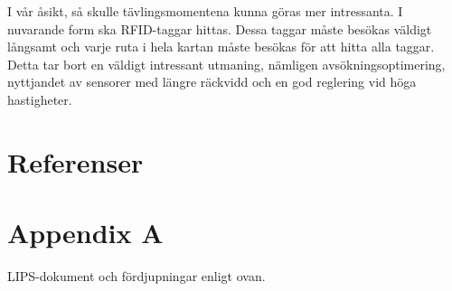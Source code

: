\documentclass[a4paper,12pt,fleqn]{article}
\begin{document}
I vår åsikt, så skulle tävlingsmomentena kunna göras mer intressanta. I nuvarande form ska RFID-taggar hittas. Dessa taggar måste besökas väldigt långsamt och varje ruta i hela kartan måste besökas för att hitta alla taggar. Detta tar bort en väldigt intressant utmaning, nämligen avsökningsoptimering, nyttjandet av sensorer med längre räckvidd och en god reglering vid höga hastigheter.


\section{Referenser}



\newpage
\appendix
\pagestyle{empty}
\section{Appendix A}


%

%

\label{komuppg.}
LIPS-dokument och fördjupningar enligt ovan.
\end{document}
